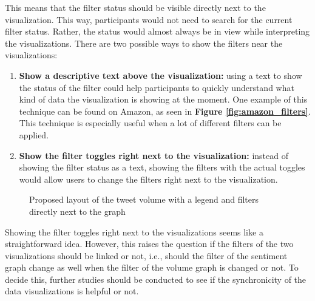 This means that the filter status should be visible directly next to the visualization. This way, participants would not need to search for the current filter status. Rather, the status would almost always be in view while interpreting the visualizations. There are two possible ways to show the filters near the visualizations:
\begin{enumerate}
    \item \textbf{Show a descriptive text above the visualization:} using a text to show the status of the filter could help participants to quickly understand what kind of data the visualization is showing at the moment. One example of this technique can be found on Amazon, as seen in \textbf{Figure \ref{fig:amazon_filters}}. This technique is especially useful when a lot of different filters can be applied.
    \item \textbf{Show the filter toggles right next to the visualization:} instead of showing the filter status as a text, showing the filters with the actual toggles would allow users to change the filters right next to the visualization.
\end{enumerate}

\begin{figure}[h!tbp]
    \caption{Proposed layout of the tweet volume with a legend and filters directly next to the graph}
    \label{fig:legend_and_filters}
\end{figure}

Showing the filter toggles right next to the visualizations seems like a straightforward idea. However, this raises the question if the filters of the two visualizations should be linked or not, i.e., should the filter of the sentiment graph change as well when the filter of the volume graph is changed or not. To decide this, further studies should be conducted to see if the synchronicity of the data visualizations is helpful or not.

